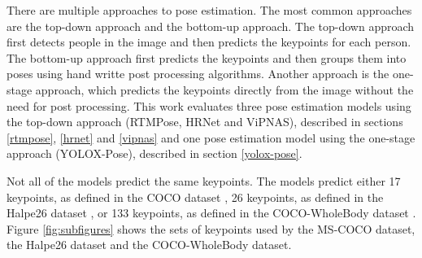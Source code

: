 There are multiple approaches to pose estimation. The most common approaches are the top-down approach and the bottom-up approach. The top-down approach first detects people in the image and then predicts the keypoints for each person. The bottom-up approach first predicts the keypoints and then groups them into poses using hand writte post processing algorithms. Another approach is the one-stage approach, which predicts the keypoints directly from the image without the need for post processing. This work evaluates three pose estimation models using the top-down approach (RTMPose, HRNet and ViPNAS), described in sections \ref{rtmpose}, \ref{hrnet} and \ref{vipnas} and one pose estimation model using the one-stage approach (YOLOX-Pose), described in section \ref{yolox-pose}.

Not all of the models predict the same keypoints. The models predict either 17 keypoints, as defined in the COCO dataset \cite{coco}, 26 keypoints, as defined in the Halpe26 dataset \cite{halpe}, or 133 keypoints, as defined in the COCO-WholeBody dataset \cite{coco-wholebody}. Figure \ref{fig:subfigures} shows the sets of keypoints used by the MS-COCO dataset, the Halpe26 dataset and the COCO-WholeBody dataset.

